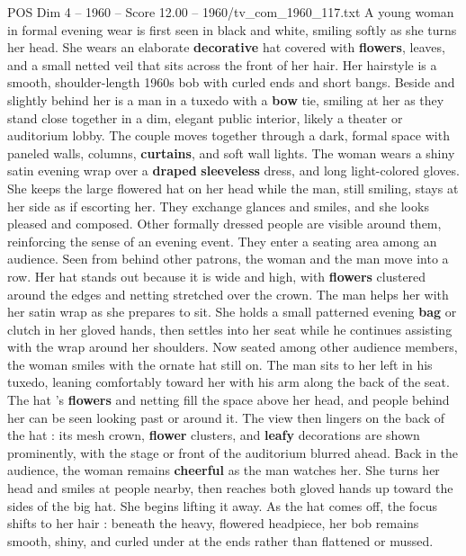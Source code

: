 \begin{textsample}{POS Dim 4 – 1960 – Score 12.00 – 1960/tv\_com\_1960\_117.txt}  \label{ex:f4_pos_070}
A young woman in formal evening wear is first seen in black and white, smiling softly as she turns her head.
She wears an elaborate \textbf{decorative} hat covered with \textbf{flowers}, leaves, and a small netted veil that sits across the front of her hair.
Her hairstyle is a smooth, shoulder-length 1960s bob with curled ends and short bangs.
Beside and slightly behind her is a man in a tuxedo with a \textbf{bow} tie, smiling at her as they stand close together in a dim, elegant public interior, likely a theater or auditorium lobby.
The couple moves together through a dark, formal space with paneled walls, columns, \textbf{curtains}, and soft wall lights.
The woman wears a shiny satin evening wrap over a \textbf{draped} \textbf{sleeveless} dress, and long light-colored gloves.
She keeps the large flowered hat on her head while the man, still smiling, stays at her side as if escorting her.
They exchange glances and smiles, and she looks pleased and composed.
Other formally dressed people are visible around them, reinforcing the sense of an evening event.
They enter a seating area among an audience.
Seen from behind other patrons, the woman and the man move into a row.
Her hat stands out because it is wide and high, with \textbf{flowers} clustered around the edges and netting stretched over the crown.
The man helps her with her satin wrap as she prepares to sit.
She holds a small patterned evening \textbf{bag} or clutch in her gloved hands, then settles into her seat while he continues assisting with the wrap around her shoulders.
Now seated among other audience members, the woman smiles with the ornate hat still on.
The man sits to her left in his tuxedo, leaning comfortably toward her with his arm along the back of the seat.
The hat ’s \textbf{flowers} and netting fill the space above her head, and people behind her can be seen looking past or around it.
The view then lingers on the back of the hat : its mesh crown, \textbf{flower} clusters, and \textbf{leafy} decorations are shown prominently, with the stage or front of the auditorium blurred ahead.
Back in the audience, the woman remains \textbf{cheerful} as the man watches her.
She turns her head and smiles at people nearby, then reaches both gloved hands up toward the sides of the big hat.
She begins lifting it away.
As the hat comes off, the focus shifts to her hair : beneath the heavy, flowered headpiece, her bob remains smooth, shiny, and curled under at the ends rather than flattened or mussed.

\end{textsample}
